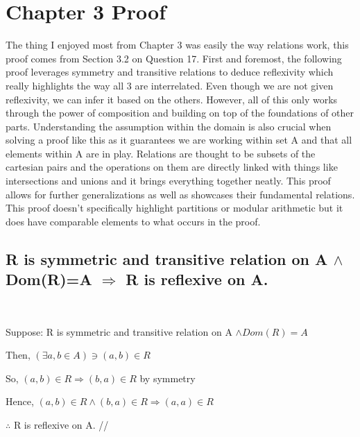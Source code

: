 \documentclass{article}
\begin{document}
\section{Chapter 3 Proof}
\justifying
The thing I enjoyed most from Chapter 3 was easily the way relations work, this proof comes from Section 3.2 on Question 17. First and foremost, the following proof leverages symmetry and transitive relations to deduce reflexivity which really highlights the way all 3 are interrelated. Even though we are not given reflexivity, we can infer it based on the others. However, all of this only works through the power of composition and building on top of the foundations of other parts. Understanding the assumption within the domain is also crucial when solving a proof like this as it guarantees we are working within set A and that all elements within A are in play. Relations are thought to be subsets of the cartesian pairs and the operations on them are directly linked with things like intersections and unions and it brings everything together neatly. This proof allows for further generalizations as well as showcases their fundamental relations. This proof doesn't specifically highlight partitions or modular arithmetic but it does have comparable elements to what occurs in the proof.

\begin{center}


\end{center}

\newpage
\subsection{R is symmetric and transitive relation on A $\wedge$  Dom(R)=A $\Rightarrow$ R is reflexive on A.}
\
\begin{center}
\raggedright
Suppose: R is symmetric and transitive relation on A $\wedge Dom(R)=A$

Then, $(\exists a,b \in A) \ni (a,b) \in R$

So, $(a,b) \in R \Rightarrow (b,a) \in R$ by symmetry

Hence, $(a,b) \in R \wedge (b,a) \in R \Rightarrow (a,a) \in R$

$\therefore$ R is reflexive on A.  //
\end{center}
\newpage
\end{document}
